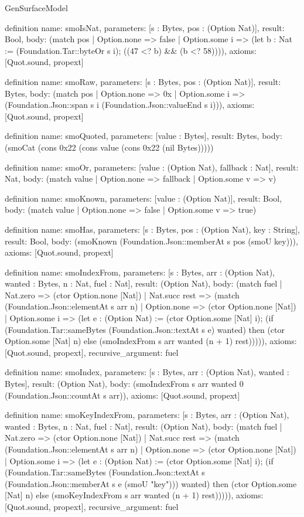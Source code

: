 \begin{lexlean}{GenSurfaceModel}
\begin{semanticmodule}
definition{
  name: smoIsNat,
  parameters: [s : Bytes, pos : (Option Nat)],
  result: Bool,
  body: (match pos
    | Option.none => false
    | Option.some i => (let b : Nat := (Foundation.Tar::byteOr s i); ((47 <? b) && (b <? 58)))),
  axioms: [Quot.sound, propext]
}

definition{
  name: smoRaw,
  parameters: [s : Bytes, pos : (Option Nat)],
  result: Bytes,
  body: (match pos
    | Option.none => 0x
    | Option.some i => (Foundation.Json::span s i (Foundation.Json::valueEnd s i))),
  axioms: [Quot.sound, propext]
}

definition{
  name: smoQuoted,
  parameters: [value : Bytes],
  result: Bytes,
  body: (smoCat (cons 0x22 (cons value (cons 0x22 (nil Bytes)))))
}

definition{
  name: smoOr,
  parameters: [value : (Option Nat), fallback : Nat],
  result: Nat,
  body: (match value | Option.none => fallback | Option.some v => v)
}

definition{
  name: smoKnown,
  parameters: [value : (Option Nat)],
  result: Bool,
  body: (match value | Option.none => false | Option.some v => true)
}

definition{
  name: smoHas,
  parameters: [s : Bytes, pos : (Option Nat), key : String],
  result: Bool,
  body: (smoKnown (Foundation.Json::memberAt s pos (smoU key))),
  axioms: [Quot.sound, propext]
}

definition{
  name: smoIndexFrom,
  parameters: [s : Bytes, arr : (Option Nat), wanted : Bytes, n : Nat, fuel : Nat],
  result: (Option Nat),
  body: (match fuel
    | Nat.zero => (ctor Option.none [Nat])
    | Nat.succ rest => (match (Foundation.Json::elementAt s arr n)
      | Option.none => (ctor Option.none [Nat])
      | Option.some i => (let e : (Option Nat) := (ctor Option.some [Nat] i); (if (Foundation.Tar::sameBytes (Foundation.Json::textAt s e) wanted) then (ctor Option.some [Nat] n) else (smoIndexFrom s arr wanted (n + 1) rest))))),
  axioms: [Quot.sound, propext],
  recursive_argument: fuel
}

definition{
  name: smoIndex,
  parameters: [s : Bytes, arr : (Option Nat), wanted : Bytes],
  result: (Option Nat),
  body: (smoIndexFrom s arr wanted 0 (Foundation.Json::countAt s arr)),
  axioms: [Quot.sound, propext]
}

definition{
  name: smoKeyIndexFrom,
  parameters: [s : Bytes, arr : (Option Nat), wanted : Bytes, n : Nat, fuel : Nat],
  result: (Option Nat),
  body: (match fuel
    | Nat.zero => (ctor Option.none [Nat])
    | Nat.succ rest => (match (Foundation.Json::elementAt s arr n)
      | Option.none => (ctor Option.none [Nat])
      | Option.some i => (let e : (Option Nat) := (ctor Option.some [Nat] i); (if (Foundation.Tar::sameBytes (Foundation.Json::textAt s (Foundation.Json::memberAt s e (smoU "key"))) wanted) then (ctor Option.some [Nat] n) else (smoKeyIndexFrom s arr wanted (n + 1) rest))))),
  axioms: [Quot.sound, propext],
  recursive_argument: fuel
}


\end{semanticmodule}
\end{lexlean}
